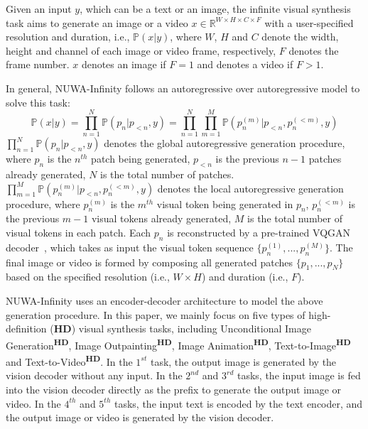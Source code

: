 \documentclass{article}
\begin{document}
Given an input $y$, which can be a text or an image, the infinite visual synthesis task aims to generate an image or a video $x\in \mathbb{R}^{W\times H\times C \times F}$ with a user-specified resolution and duration, i.e., $\mathbb{P}(x|y)$, where $W$, $H$ and $C$ denote the width, height and channel of each image or video frame, respectively, $F$ denotes the frame number. $x$ denotes an image if $F=1$ and denotes a video if $F>1$. 

In general, NUWA-Infinity follows an autoregressive over autoregressive model to solve this task:
\begin{equation}\label{eq:pxy}
    \mathbb{P}\left(x|y \right )=\prod_{n=1}^{N}\mathbb{P}\left (p_{n}|p_{<n},y\right)
    =\prod_{n=1}^{N}\prod_{m=1}^{M}\mathbb{P}\left ( p_{n}^{(m)}|p_{<n},p_{n}^{(<m)}, y\right )
\end{equation}
$\prod_{n=1}^{N}\mathbb{P}\left (p_{n}|p_{<n},y\right)$ denotes the global autoregressive generation procedure, where $p_n$ is the $n^{th}$ patch being generated, $p_{<n}$ is the previous $n-1$ patches already generated, $N$ is the total number of patches. $\prod_{m=1}^{M}\mathbb{P}\left (p_{n}^{(m)}|p_{<n},p_{n}^{(<m)}, y\right )$ denotes the local autoregressive generation procedure, where $p_{n}^{(m)}$ is the $m^{th}$ visual token being generated in $p_n$, $p_{n}^{(<m)}$ is the previous $m-1$ visual tokens already generated, $M$ is the total number of visual tokens in each patch. Each $p_n$ is reconstructed by a pre-trained VQGAN decoder~\cite{esserTamingTransformersHighResolution2021}, which takes as input the visual token sequence $\{p_n^{(1)},...,p_n^{(M)}\}$. The final image or video is formed by composing all generated patches $\{p_1,...,p_N\}$ based on the specified resolution (i.e., $W \times H$) and duration (i.e., $F$).

NUWA-Infinity uses an encoder-decoder architecture to model the above generation procedure. In this paper, we mainly focus on five types of high-definition (\textbf{HD}) visual synthesis tasks, including Unconditional Image Generation\textsuperscript{\textbf{HD}}, Image Outpainting\textsuperscript{\textbf{HD}}, Image Animation\textsuperscript{\textbf{HD}}, Text-to-Image\textsuperscript{\textbf{HD}} and Text-to-Video\textsuperscript{\textbf{HD}}. In the $1^{st}$ task, the output image is generated by the vision decoder without any input. In the $2^{nd}$ and $3^{rd}$ tasks, the input image is fed into the vision decoder directly as the prefix to generate the output image or video. In the $4^{th}$ and $5^{th}$ tasks, the input text is encoded by the text encoder, and the output image or video is generated by the vision decoder.
\end{document}
